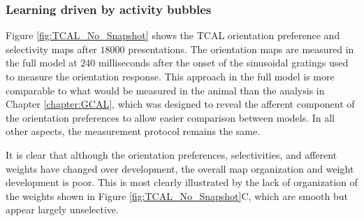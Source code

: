 \documentclass[phd,ianc,twoside]{infthesis}
\begin{document}
\subsubsection*{Learning driven by activity bubbles}
\label{section:TCAL_snapshot_learning}

Figure \ref{fig:TCAL_No_Snapshot} shows the TCAL orientation preference
and selectivity maps after $18000$ presentations. The orientation maps
are measured in the full model at $240$ milliseconds after the onset of
the sinusoidal gratings used to measure the orientation response. This
approach in the full model is more comparable to what would be measured
in the animal than the analysis in Chapter \ref{chapter:GCAL}, which was
designed to reveal the afferent component of the orientation preferences
to allow easier comparison between models. In all other aspects, the
measurement protocol remains the same.

It is clear that although the orientation preferences, selectivities, and
afferent weights have changed over development, the overall map
organization and weight development is poor. This is most clearly
illustrated by the lack of organization of the weights shown in Figure
\ref{fig:TCAL_No_Snapshot}C, which are smooth but appear largely unselective.
\end{document}
